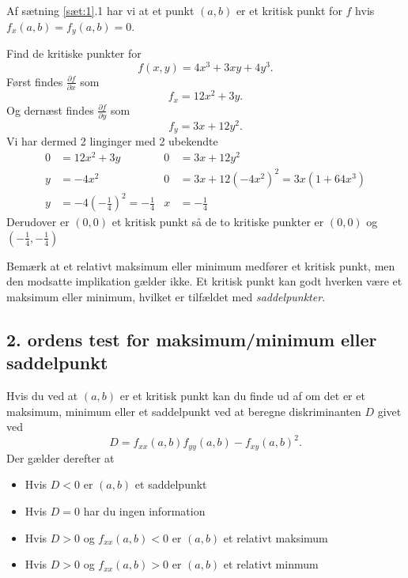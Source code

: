 Af sætning \autoref{sæt:1}.1 har vi at et punkt $(a,b)$ er et kritisk punkt for $f$ hvis $f_x(a,b) = f_y(a,b) = 0$. 

\begin{eks}
  Find de kritiske punkter for
  \[ 
  f(x,y) = 4x^3 + 3xy + 4y^3
  .\]
  Først findes $\frac{\partial f}{\partial x}$ som
  \[ 
  f_x = 12x^2 + 3y
  .\]
  Og dernæst findes $\frac{\partial f}{\partial y}$ som
  \[ 
  f_y = 3x + 12y^2
  .\]
  Vi har dermed 2 linginger med 2 ubekendte
  \begin{align*}
    0 &= 12x^2 + 3y & 0 &= 3x + 12y^2 \\
    y &= -4x^2 & 0 &= 3x + 12(-4x^2)^2 = 3x \left( 1 + 64x^3 \right) \\
    y &= -4(-\frac{1}{4})^2 = -\frac{1}{4} & x &= -\frac{1}{4}
  \end{align*}
  Derudover er $(0,0)$ et kritisk punkt så de to kritiske punkter er $(0,0)$ og $(-\frac{1}{4}, -\frac{1}{4})$
\end{eks}

Bemærk at et relativt maksimum eller minimum medfører et kritisk punkt, men den modsatte implikation gælder ikke. Et kritisk punkt kan godt hverken være et maksimum eller minimum, hvilket er tilfældet med \textit{saddelpunkter}.

\subsection{2. ordens test for maksimum/minimum eller saddelpunkt}
Hvis du ved at $(a,b)$ er et kritisk punkt kan du finde ud af om det er et maksimum, minimum eller et saddelpunkt ved at beregne diskriminanten $D$ givet ved
\[ 
D = f_{x x}(a,b)f_{yy}(a,b) - f_{xy}(a,b)^2
.\]
Der gælder derefter at
\begin{itemize}
  \item Hvis $D<0$ er $(a,b)$ et saddelpunkt
  \item Hvis $D = 0$ har du ingen information
  \item Hvis $D>0$ og $f_{x x}(a,b)<0$ er $(a,b)$ et relativt maksimum
  \item Hvis $D>0$ og $f_{x x}(a,b)>0$ er $(a,b)$ et relativt minmum
\end{itemize}

